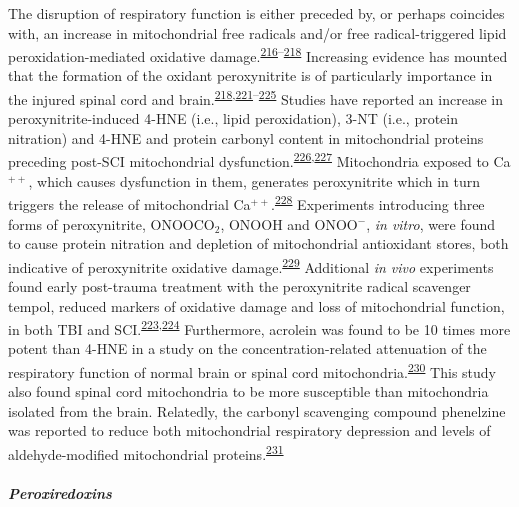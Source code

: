 \documentclass[
]{article}
\begin{document}
The disruption of respiratory function is either preceded by, or perhaps coincides with, an increase in mitochondrial free radicals and/or free radical-triggered lipid peroxidation-mediated oxidative damage.\textsuperscript{\protect\hyperlink{ref-singh_time_2006}{216}--\protect\hyperlink{ref-sullivan_temporal_2007}{218}}
Increasing evidence has mounted that the formation of the oxidant peroxynitrite is of particularly importance in the injured spinal cord and brain.\textsuperscript{\protect\hyperlink{ref-sullivan_temporal_2007}{218},\protect\hyperlink{ref-bao_peroxynitrite_2002}{221}--\protect\hyperlink{ref-xiong_role_2007}{225}}
Studies have reported an increase in peroxynitrite-induced 4-HNE (i.e., lipid peroxidation), 3-NT (i.e., protein nitration) and 4-HNE and protein carbonyl content in mitochondrial proteins preceding post-SCI mitochondrial dysfunction.\textsuperscript{\protect\hyperlink{ref-lopez-figueroa_direct_2000}{226},\protect\hyperlink{ref-zanella_mitochondrial_2002}{227}}
Mitochondria exposed to Ca\(^{++}\), which causes dysfunction in them, generates peroxynitrite which in turn triggers the release of mitochondrial Ca\(^{++}\).\textsuperscript{\protect\hyperlink{ref-bringold_peroxynitrite_2000}{228}}
Experiments introducing three forms of peroxynitrite, ONOOCO\(_2\), ONOOH and ONOO\(^-\), \emph{in vitro}, were found to cause protein nitration and depletion of mitochondrial antioxidant stores, both indicative of peroxynitrite oxidative damage.\textsuperscript{\protect\hyperlink{ref-valdez_reactions_2000}{229}}
Additional \emph{in vivo} experiments found early post-trauma treatment with the peroxynitrite radical scavenger tempol, reduced markers of oxidative damage and loss of mitochondrial function, in both TBI and SCI.\textsuperscript{\protect\hyperlink{ref-deng_temporal_2007}{223},\protect\hyperlink{ref-xiong_pharmacological_2009}{224}}
Furthermore, acrolein was found to be 10 times more potent than 4-HNE in a study on the concentration-related attenuation of the respiratory function of normal brain or spinal cord mitochondria.\textsuperscript{\protect\hyperlink{ref-vaishnav_lipid_2010}{230}}
This study also found spinal cord mitochondria to be more susceptible than mitochondria isolated from the brain.
Relatedly, the carbonyl scavenging compound phenelzine was reported to reduce both mitochondrial respiratory depression and levels of aldehyde-modified mitochondrial proteins.\textsuperscript{\protect\hyperlink{ref-singh_phenelzine_2013}{231}}

\hypertarget{peroxiredoxins}{%
\subparagraph{Peroxiredoxins}\label{peroxiredoxins}}
\end{document}
